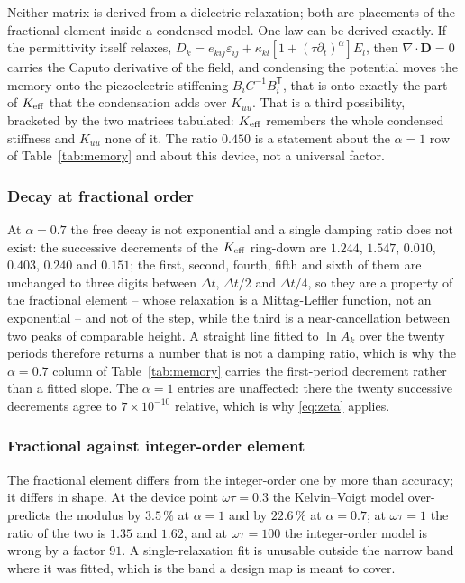 Neither matrix is derived from a dielectric relaxation; both are placements of
the fractional element inside a condensed model. One law can be derived
exactly. If the permittivity itself relaxes,
$D_k=e_{kij}\varepsilon_{ij}+\kappa_{kl}[1+(\tau\partial_t)^{\alpha}]E_l$,
then $\nabla\cdot\bm D=0$ carries the Caputo derivative of the field, and
condensing the potential moves the memory onto the piezoelectric stiffening
$B_iC^{-1}B_i^{\mathsf T}$, that is onto exactly the part of $K_{\rm eff}$ that
the condensation adds over $K_{uu}$. That is a third possibility, bracketed by
the two matrices tabulated: $K_{\rm eff}$ remembers the whole condensed
stiffness and $K_{uu}$ none of it. The ratio $0.450$ is a statement about the
$\alpha=1$ row of Table~\ref{tab:memory} and about this device, not a universal
factor.



\subsubsection{Decay at fractional order}

At $\alpha=0.7$ the free decay is not exponential and a single damping ratio
does not exist: the successive decrements of the $K_{\rm eff}$ ring-down are
$1.244$, $1.547$, $0.010$, $0.403$, $0.240$ and $0.151$; the first, second,
fourth, fifth and sixth of them are unchanged to three digits between
$\Delta t$, $\Delta t/2$ and $\Delta t/4$, so they are a property of the
fractional element -- whose relaxation is a Mittag-Leffler function, not an
exponential -- and not of the step, while the third is a near-cancellation
between two peaks of comparable height. A straight line fitted to $\ln A_k$
over the twenty periods therefore returns a number that is not a damping ratio,
which is why the $\alpha=0.7$ column of Table~\ref{tab:memory} carries the
first-period decrement rather than a fitted slope. The $\alpha=1$ entries are
unaffected: there the twenty successive decrements agree to $7\times10^{-10}$
relative, which is why \eqref{eq:zeta} applies.

\subsubsection{Fractional against integer-order element}

The fractional element differs from the integer-order one by more than
accuracy; it differs in shape. At the device point $\omega\tau=0.3$ the
Kelvin--Voigt model over-predicts the modulus by $3.5\,\%$ at $\alpha=1$ and by
$22.6\,\%$ at $\alpha=0.7$; at $\omega\tau=1$ the ratio of the two is $1.35$
and $1.62$, and at $\omega\tau=100$ the integer-order model is wrong by a
factor $91$. A single-relaxation fit is unusable outside the narrow band where
it was fitted, which is the band a design map is meant to cover.

